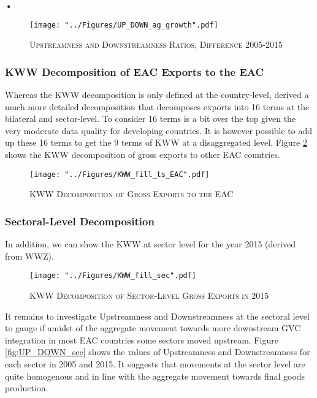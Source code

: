 \textbf{\textbf{•}}\documentclass[a4paper]{article}
\begin{document}
\begin{figure}[h!]
\centering
\caption{\label{fig:UP_DOWN_ag_growth}\textsc{Upstreamness and Downstreamness Ratios, Difference 2005-2015}}
\texttt{[image: "../Figures/UP\_DOWN\_ag\_growth".pdf]} %
\end{figure}
\FloatBarrier


\subsubsection{KWW Decomposition of EAC Exports to the EAC}

Whereas the KWW decomposition is only defined at the country-level, \citet{Wang2014} derived a much more detailed decomposition that decomposes exports into 16 terms at the bilateral and sector-level. To consider 16 terms is a bit over the top given the very moderate data quality for developing countries. It is however possible to add up these 16 terms to get the 9 terms of KWW at a disaggregated level. Figure \ref{fig:KWW_fill_ts_EAC} shows the KWW decomposition of gross exports to other EAC countries. 

\begin{figure}[h!]
\centering
\caption{\label{fig:KWW_fill_ts_EAC}\textsc{KWW Decomposition of Gross Exports to the EAC}}
\texttt{[image: "../Figures/KWW\_fill\_ts\_EAC".pdf]} %
\end{figure}
\FloatBarrier


\subsubsection{Sectoral-Level Decomposition}
In addition, we can show the KWW at sector level for the year 2015 (derived from WWZ).

\begin{figure}[h!]
\centering
\caption{\label{fig:KWW_fill_sec}\textsc{KWW Decomposition of Sector-Level Gross Exports in 2015}}
\texttt{[image: "../Figures/KWW\_fill\_sec".pdf]} %
\end{figure}
\FloatBarrier

It remains to investigate Upstreamness and Downstreamness at the sectoral level to gauge if amidst of the aggregate movement towards more downstream GVC integration in most EAC countries some sectors moved upstream. Figure \ref{fig:UP_DOWN_sec} shows the values of Upstreamness and Downstreamness for each sector in 2005 and 2015. It suggests that movements at the sector level are quite homogenous and in line with the aggregate movement towards final goods production. 
\end{document}
